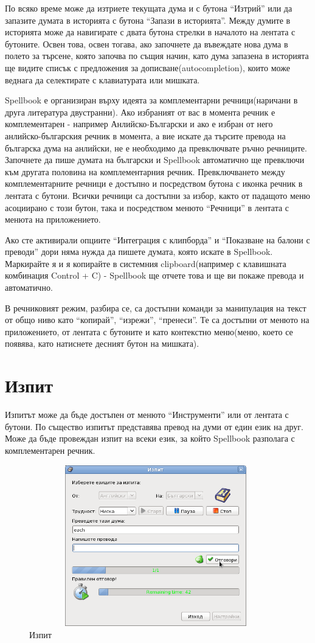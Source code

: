 По всяко време може да изтриете текущата дума и с бутона "`Изтрий"'
или да запазите думата в историята с бутона "`Запази в
историята"'. Между думите в историята може да навигирате с двата
бутона стрелки в началото на лентата с бутоните. Освен това, освен
тогава, ако започнете да въвеждате нова дума в полето за търсене,
която започва по същия начин, като дума запазена в историята ще видите
списък с предложения за дописване(autocompletion), които може веднага
да селектирате с клавиатурата или мишката.

Spellbook е организиран върху идеята за комплементарни
речници(наричани в друга литература двустранни). Ако избраният от вас
в момента речник е комплементарен - например Анлийско-Български и ако
е избран от него анлийско-българския речник в момента, а вие искате да
търсите превода на българска дума на анлийски, не е необходимо да
превключвате ръчно речниците. Започнете да пише думата на български и
Spellbook автоматично ще превключи към другата половина на
комплементарния речник. Превключването между комплементарните речници
е достъпно и посредством бутона с иконка речник в лентата с
бутони. Всички речници са достъпни за избор, както от падащото меню
асоциирано с този бутон, така и посредством менюто "`Речници"' в
лентата с менюта на приложението.

Ако сте активирали опциите "`Интеграция с клипборда"' и "`Показване на
балони с преводи"' дори няма нужда да пишете думата, която искате в
Spellbook. Маркирайте я и я копирайте в системния clipboard(например с
клавишната комбинация Control + C) - Spellbook ще отчете това и ще ви
покаже превода и автоматично.

В речниковият режим, разбира се, са достъпни команди за манипулация на
текст от общо ниво като "`копирай"', "`изрежи"', "`пренеси"'. Те са
достъпни от менюто на приложението, от лентата с бутоните и като
контекстно меню(меню, което се появява, като натиснете десният бутон
на мишката).
\section{Изпит}
Изпитът може да бъде достъпен от менюто "`Инструменти"' или от лентата
с бутони. По същество изпитът представява превод на думи от един език
на друг. Може да бъде провеждан изпит на всеки език, за който
Spellbook разполага с комплементарен речник. 

\begin{figure}[htbp]
  \caption{Изпит}
  \centering
  \includegraphics[width=110mm, height=70mm]{images/exam_dialog.png}
\end{figure}

